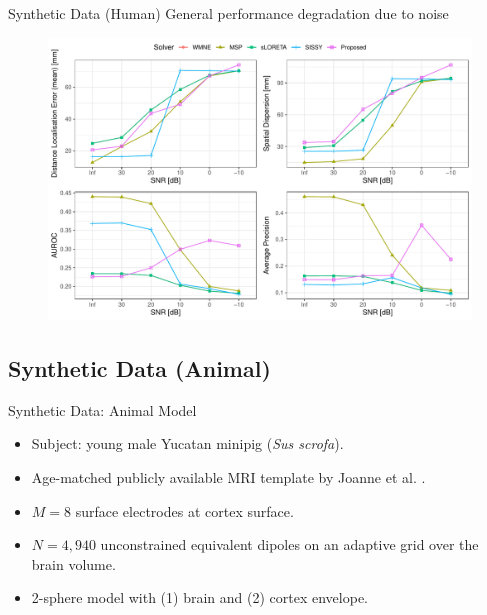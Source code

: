 \documentclass[progressbar=head]{beamer}
\begin{document}
\begin{frame}{Synthetic Data (Human)}
General performance degradation due to noise
\begin{figure}
    \centering
    \includegraphics[width=0.7\linewidth]{img_stats/P_SNRdegradation_EvalMetrics_Protocol04_30.pdf}
\end{figure}
\end{frame}


{
\subsection{Synthetic Data (Animal)}
}


\begin{frame}{Synthetic Data: Animal Model}
\begin{itemize}
\item Subject: young male Yucatan minipig (\textit{Sus scrofa}).
\item Age-matched publicly available MRI template by Joanne et al. \cite{pig_template}.
\item $M=8$ surface electrodes at cortex surface.
\item $N=4,940$ unconstrained equivalent dipoles on an adaptive grid over the brain volume.
\item 2-sphere model with (1) brain and (2) cortex envelope. 
\end{itemize}
\end{frame}
\end{document}
